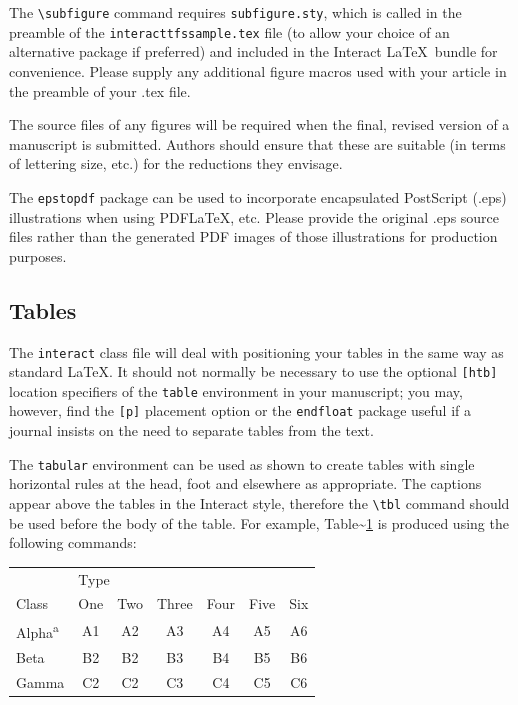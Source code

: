 \documentclass[]{interact}
\theoremstyle{plain}%
\theoremstyle{definition}
\theoremstyle{remark}
\begin{document}
The \texttt{\textbackslash{}subfigure} command requires
\texttt{subfigure.sty}, which is called in the preamble of the
\texttt{interacttfssample.tex} file (to allow your choice of an
alternative package if preferred) and included in the \textsf{Interact}
\LaTeX~bundle for convenience. Please supply any additional figure
macros used with your article in the preamble of your .tex file.

The source files of any figures will be required when the final, revised
version of a manuscript is submitted. Authors should ensure that these
are suitable (in terms of lettering size, etc.) for the reductions they
envisage.

The \texttt{epstopdf} package can be used to incorporate encapsulated
PostScript (.eps) illustrations when using PDF\LaTeX, etc. Please
provide the original .eps source files rather than the generated PDF
images of those illustrations for production purposes.

\hypertarget{tables}{%
\subsection{Tables}\label{tables}}

The \texttt{interact} class file will deal with positioning your tables
in the same way as standard \LaTeX. It should not normally be necessary
to use the optional \texttt{{[}htb{]}} location specifiers of the
\texttt{table} environment in your manuscript; you may, however, find
the \texttt{{[}p{]}} placement option or the \texttt{endfloat} package
useful if a journal insists on the need to separate tables from the
text.

The \texttt{tabular} environment can be used as shown to create tables
with single horizontal rules at the head, foot and elsewhere as
appropriate. The captions appear above the tables in the
\textsf{Interact} style, therefore the \texttt{\textbackslash{}tbl}
command should be used before the body of the table. For example,
Table\textasciitilde{}\ref{sample-table} is produced using the following
commands:

\begin{table}
{\begin{tabular}{lcccccc} \toprule
 & \multicolumn{2}{l}{Type} \\ \cmidrule{2-7}
 Class & One & Two & Three & Four & Five & Six \\ \midrule
 Alpha\textsuperscript{a} & A1 & A2 & A3 & A4 & A5 & A6 \\
 Beta & B2 & B2 & B3 & B4 & B5 & B6 \\
 Gamma & C2 & C2 & C3 & C4 & C5 & C6 \\ \bottomrule
\end{tabular}}
\label{sample-table}
\end{table}
\end{document}
